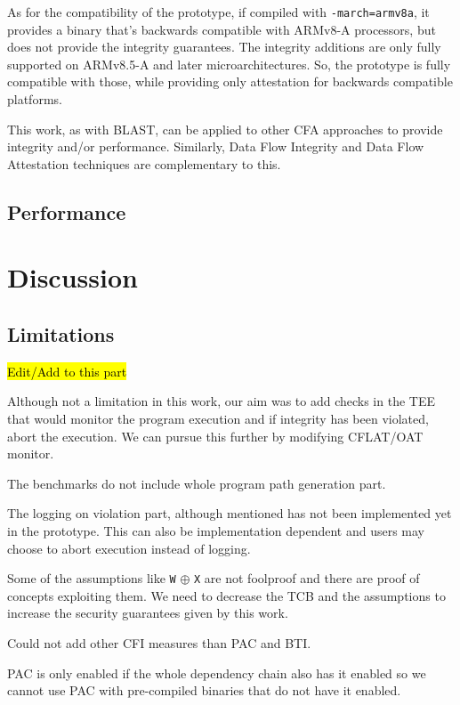 \documentclass[a4paper, nobind]{templates/ociamthesis}
\begin{document}
As for the compatibility of the prototype, if compiled with \texttt{-march=armv8a}, it
provides a binary that's backwards compatible with ARMv8-A processors,
but does not provide the integrity guarantees.
The integrity additions are only fully supported on ARMv8.5-A and later microarchitectures.
So, the prototype is fully compatible with those, while providing only attestation for
backwards compatible platforms.

This work, as with BLAST, can be applied to other CFA approaches to provide
integrity and/or performance. Similarly, Data Flow Integrity and Data Flow Attestation
techniques are complementary to this.

\section{Performance}\label{performance}

\chapter{Discussion}\label{discussion}

\minitoc 

\section{Limitations}\label{limitations-2}

\hl{Edit/Add to this part}

Although not a limitation in this work, our aim was to add checks in the TEE
that would monitor the program execution and if integrity has been violated,
abort the execution. We can pursue this further by modifying CFLAT/OAT monitor.

The benchmarks do not include whole program path generation part.

The logging on violation part, although mentioned has not been implemented yet
in the prototype. This can also be implementation dependent and users may choose
to abort execution instead of logging.

Some of the assumptions like \texttt{W} \(\oplus\) \texttt{X} are not foolproof and there are
proof of concepts exploiting them. We need to decrease the TCB and the
assumptions to increase the security guarantees given by this work.

Could not add other CFI measures than PAC and BTI.

PAC is only enabled if the whole dependency chain also has it enabled so we
cannot use PAC with pre-compiled binaries that do not have it enabled.
\end{document}
